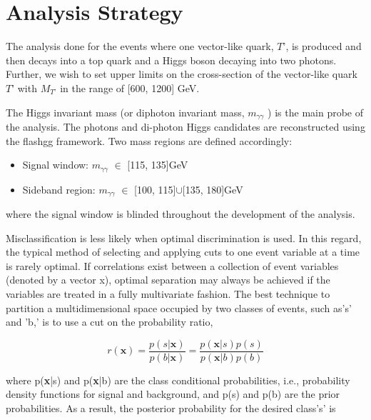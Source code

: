 \chapter{\label{AN}Analysis Strategy}




The analysis done for the events where one vector-like quark, $T’$, is produced and then decays into a top quark and a Higgs boson decaying into two photons. Further, we wish to set upper limits on the cross-section of the vector-like quark $T’$ with $M_{T’}$ in the range of [600, 1200] GeV.

The Higgs invariant mass (or diphoton invariant mass, $m_{\gamma\gamma}$ ) is the main probe of the analysis. The photons and di-photon Higgs candidates are reconstructed using the flashgg framework\cite{CrossSection_6}.
 Two mass regions are defined accordingly:
\begin{itemize}
    \item Signal window:  $m_{\gamma\gamma}$ $\in$ [115, 135]GeV
    \item Sideband region: $m_{\gamma\gamma}$ $\in$ [100, 115]$\cup$[135, 180]GeV
\end{itemize}
where the signal window is blinded throughout the development of the analysis.



Misclassification is less likely when optimal discrimination is used. In this regard, the typical method of selecting and applying cuts to one event variable at a time is rarely optimal. If correlations exist between a collection of event variables (denoted by a vector x), optimal separation may always be achieved if the variables are treated in a fully multivariate fashion. The best technique to partition a multidimensional space occupied by two classes of events, such as's' and 'b,' is to use a cut on the probability ratio,

\begin{equation}
    r(\textbf{x}) = \frac{p(s|\textbf{x})}{p(b|\textbf{x})} = \frac{p(\textbf{x}|s) p(s) }{p(\textbf{x}|b) p(b) }
\end{equation}

where  p(\textbf{x}|s) and p(\textbf{x}|b) are the class conditional probabilities, i.e., probability density functions for signal and background, and p(s) and p(b) are the prior probabilities.
 As a result, the posterior probability for the desired class's' is
 

